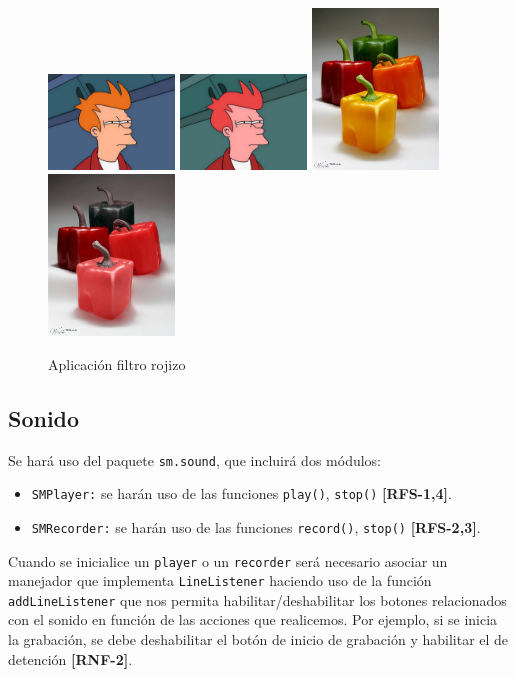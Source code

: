 \begin{figure}[H]
 \centering
 \includegraphics[width=0.3\textwidth]{imagenes/Fry.jpg}
  \includegraphics[width=0.3\textwidth]{imagenes/fryRojido.jpg}
  \vskip0.3cm
  \includegraphics[width=0.3\textwidth]{imagenes/pimientos.jpg}
  \includegraphics[width=0.3\textwidth]{imagenes/pimientoRojizo.jpg}
 \caption{Aplicación filtro rojizo}
 \label{diseño}
 \end{figure}
 
\subsection{Sonido}
Se hará uso del paquete \texttt{sm.sound}, que incluirá dos módulos:
\begin{itemize}
\item{\texttt{SMPlayer:} se harán uso de las funciones \texttt{play()}, \texttt{stop()} \textbf{[RFS-1,4]}.}
\item{\texttt{SMRecorder:} se harán uso de las funciones \texttt{record()}, \texttt{stop()} \textbf{[RFS-2,3]}.}
\end{itemize}
Cuando se inicialice un \texttt{player} o un \texttt{recorder} será necesario asociar un manejador que implementa \texttt{LineListener} haciendo uso de la función \texttt{addLineListener} que nos permita habilitar/deshabilitar los botones relacionados con el sonido en función de las acciones que realicemos. Por ejemplo, si se inicia la grabación, se debe deshabilitar el botón de inicio de grabación y habilitar el de detención \textbf{[RNF-2]}.
